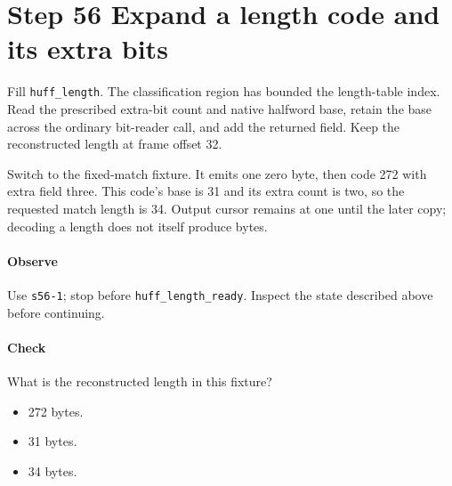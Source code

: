\section{Step 56 Expand a length code and its extra bits}\label{png-huff-s56}
Fill \texttt{huff\_length}. The classification region has bounded the length-table index. Read the prescribed extra-bit count and native halfword base, retain the base across the ordinary bit-reader call, and add the returned field. Keep the reconstructed length at frame offset 32.

Switch to the fixed-match fixture. It emits one zero byte, then code 272 with extra field three. This code's base is 31 and its extra count is two, so the requested match length is 34. Output cursor remains at one until the later copy; decoding a length does not itself produce bytes.

\paragraph{Observe} Use \texttt{s56-1}; stop before \texttt{huff\_length\_ready}. Inspect the state described above before continuing.

\paragraph{Check} What is the reconstructed length in this fixture?
\begin{itemize}
  \item[A.] 272 bytes.
  \item[B.] 31 bytes.
  \item[C.] 34 bytes.
\end{itemize}
